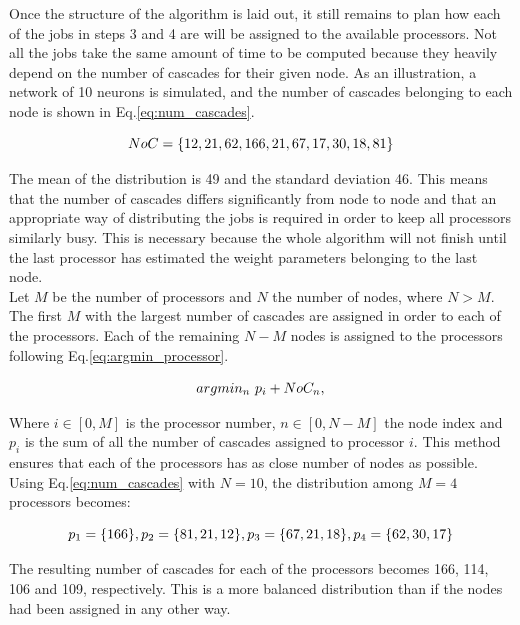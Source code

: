 Once the structure of the algorithm is laid out, it still remains to plan how each of the jobs in steps 3 and 4 are will be assigned to the available processors. Not all the jobs take the same amount of time to be computed because they heavily depend on the number of cascades for their given node. As an illustration, a network of 10 neurons is simulated, and the number of cascades belonging to each node is shown in Eq.\ref{eq:num_cascades}. 

\begin{equation}
	\centering
	NoC = \{12, 21, 62, 166, 21, 67, 17, 30, 18, 81\}
	\label{eq:num_cascades}
\end{equation}

The mean of the distribution is 49 and the standard deviation 46. This means that the number of cascades differs significantly from node to node and that an appropriate way of distributing the jobs is required in order to keep all processors similarly busy. This is necessary because the whole algorithm will not finish until the last processor has estimated the weight parameters belonging to the last node. \\

Let \(M\) be the number of processors and \(N\) the number of nodes, where \(N > M\). The first \(M\) with the largest number of cascades are assigned in order to each of the processors. Each of the remaining \(N-M\) nodes is assigned to the processors following Eq.\ref{eq:argmin_processor}.

\begin{equation}
	\centering
	argmin_{n} \text{ } p_{i} + NoC_{n}, 
	\label{eq:argmin_processor}
\end{equation}

Where \(i \in [0,M]\) is the processor number, \(n \in [0, N - M]\) the node index and \(p_{i}\) is the sum of all the number of cascades assigned to processor \(i\). This method ensures that each of the processors has as close number of nodes as possible. Using Eq.\ref{eq:num_cascades} with \(N=10\), the distribution among \(M = 4\) processors becomes:

\begin{equation}
	\centering
	p_{1} = \{166\}, p_{2} = \{81, 21, 12\}, p_{3} = \{67, 21, 18\}, p_{4} = \{62, 30, 17\}
	\label{eq:distribution_processors}
\end{equation}

The resulting number of cascades for each of the processors becomes 166, 114, 106 and 109, respectively. This is a more balanced distribution than if the nodes had been assigned in any other way. \\

